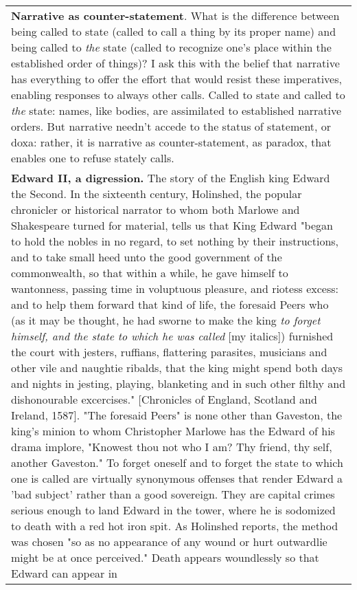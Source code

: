 \begin{longtable}[]{@{}l@{}}
\begin{minipage}[t]{0.97\columnwidth}\raggedright
\textbf{Narrative as counter-statement}. What is the difference between
being called to state (called to call a thing by its proper name) and
being called to \emph{the} state (called to recognize one's place within
the established order of things)? I ask this with the belief that
narrative has everything to offer the effort that would resist these
imperatives, enabling responses to always other calls. Called to state
and called to \emph{the} state: names, like bodies, are assimilated to
established narrative orders. But narrative needn't accede to the status
of statement, or doxa: rather, it is narrative as counter-statement, as
paradox, that enables one to refuse stately calls.\strut
\end{minipage}\tabularnewline
\begin{minipage}[t]{0.97\columnwidth}\raggedright
\textbf{Edward II, a digression.} The story of the English king Edward
the Second. In the sixteenth century, Holinshed, the popular chronicler
or historical narrator to whom both Marlowe and Shakespeare turned for
material, tells us that King Edward "began to hold the nobles in no
regard, to set nothing by their instructions, and to take small heed
unto the good government of the commonwealth, so that within a while, he
gave himself to wantonness, passing time in voluptuous pleasure, and
riotess excess: and to help them forward that kind of life, the foresaid
Peers who (as it may be thought, he had sworne to make the king \emph{to
forget himself, and the state to which he was called} {[}my italics{]})
furnished the court with jesters, ruffians, flattering parasites,
musicians and other vile and naughtie ribalds, that the king might spend
both days and nights in jesting, playing, blanketing and in such other
filthy and dishonourable excercises." {[}Chronicles of England, Scotland
and Ireland, 1587{]}. "The foresaid Peers" is none other than Gaveston,
the king's minion to whom Christopher Marlowe has the Edward of his
drama implore, "Knowest thou not who I am? Thy friend, thy self, another
Gaveston." To forget oneself and to forget the state to which one is
called are virtually synonymous offenses that render Edward a 'bad
subject' rather than a good sovereign. They are capital crimes serious
enough to land Edward in the tower, where he is sodomized to death with
a red hot iron spit. As Holinshed reports, the method was chosen "so as
no appearance of any wound or hurt outwardlie might be at once
perceived." Death appears woundlessly so that Edward can appear in

\end{minipage}
\end{longtable}
